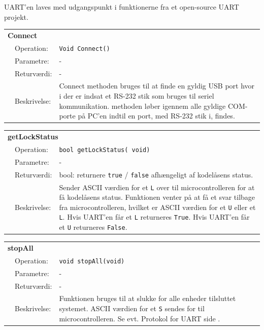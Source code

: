 UART'en laves med udgangspunkt i funktionerne fra et open-source UART projekt. \cite{lib:UART}

\begin{table}[h]
\begin{tabularx}{\textwidth}{p{0.6 cm} l X} %
\multicolumn{3}{l}{\textbf{Connect}}\\
& Operation: & 
\texttt{Void Connect()}
\\ & Parametre: & 
 - 
\\ & Returværdi: & 
-
\\ & Beskrivelse: & 
Connect methoden bruges til at finde en gyldig USB port hvor i der er indsat et RS-232 stik som bruges til seriel kommunikation. methoden løber igennem alle gyldige COM-porte på PC'en indtil en port, med RS-232 stik i, findes.
\\ \end{tabularx}
\end{table}

\begin{table}[h]
\begin{tabularx}{\textwidth}{p{0.6 cm} l X} %
\multicolumn{3}{l}{\textbf{getLockStatus}}\\
& Operation: & 
\texttt{bool getLockStatus( void)}
\\ & Parametre: & 
 - 
\\ & Returværdi: & 
bool: returnere \texttt{true} / \texttt{false} afhængeligt af kodelåsens status.
\\ & Beskrivelse: & 
Sender ASCII værdien for et \texttt{L} over til microcontrolleren for at få kodelåsens status. Funktionen venter på at få et svar tilbage fra microcontrolleren, hvilket er ASCII værdien for et \texttt{U} eller et \texttt{L}.
Hvis UART'en får et \texttt{L} returneres \texttt{True}.
Hvis UART'en får et \texttt{U} returneres \texttt{False}.
\\ \end{tabularx}
\end{table}

\begin{table}[h]
\begin{tabularx}{\textwidth}{p{0.6 cm} l X} %
\multicolumn{3}{l}{\textbf{stopAll}}\\
& Operation: & 
\texttt{void stopAll(void)}
\\ & Parametre: & 
 - 
\\ & Returværdi: & 
-
\\ & Beskrivelse: & 
Funktionen bruges til at slukke for alle enheder tilsluttet systemet. ASCII værdien for et \texttt{S} sendes for til  microcontrolleren. Se evt. Protokol for UART side \pageref{prot_UART}.
\\ \end{tabularx}
\end{table}

